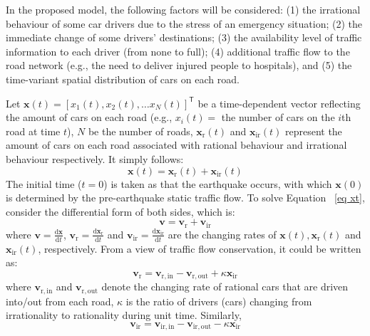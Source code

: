 \documentclass[review,11pt,nonatbib]{elsarticle}
\begin{document}
\par In the proposed model, the following factors will be considered: (1) the irrational behaviour of some car drivers due to the stress of an emergency situation; (2) the immediate change of some drivers' destinations; (3) the availability level of traffic information to each driver (from none to full); (4) additional traffic flow to the road network (e.g., the need to deliver injured people to hospitals), and (5) the time-variant spatial distribution of cars on each road.
\par Let $\mathbf{x}(t) = [x_1(t),x_2(t),\ldots x_N(t)]^{\textsf{T}}$ be a time-dependent vector reflecting the amount of cars on each road (e.g., $x_i(t) = $ the number of cars on the $i$th road at time $t$),  $N$ be the number of roads, $\mathbf{x}_{\mathrm{r}}(t)$ and $\mathbf{x}_{\mathrm{ir}}(t)$ represent the amount of cars on each road associated with rational behaviour and irrational behaviour respectively. It simply follows:
\begin{equation}\label{eq xt}
\mathbf{x}(t)=\mathbf{x}_{\mathrm{r}}(t)+\mathbf{x}_{\mathrm{ir}}(t)
\end{equation}
The initial time ($t=0$) is taken as that the earthquake occurs, with which $\mathbf{x}(0)$ is determined by the pre-earthquake static traffic flow. To solve Equation ~\eqref{eq xt}, consider the differential form of both sides, which is:
\begin{equation}
\mathbf{v} = \mathbf{v}_{\mathrm{r}} + \mathbf{v}_{\mathrm{ir}}
\end{equation}
where $\mathbf{v} = \frac{\mathrm{d}\mathbf{x}}{\mathrm{d}t}$, $\mathbf{v}_{\mathrm{r}} = \frac{\mathrm{d}\mathbf{x}_{\mathrm{r}}}{\mathrm{d}t}$ and $ \mathbf{v}_{\mathrm{ir}} = \frac{\mathrm{d}\mathbf{x}_{\mathrm{ir}}}{\mathrm{d}t}$ are the changing rates of $\mathbf{x}(t), \mathbf{x}_{\mathrm{r}}(t)$ and $\mathbf{x}_{\mathrm{ir}}(t)$, respectively. From a view of traffic flow conservation, it could be written as:
\begin{equation}\label{eq vr}
\mathbf{v}_{\mathrm{r}}  = \mathbf{v}_{\mathrm{r,in}} - \mathbf{v}_{\mathrm{r,out}} + \kappa \mathbf{x}_{\mathrm{ir}}
\end{equation}
where $\mathbf{v}_{\mathrm{r,in}} $ and $\mathbf{v}_{\mathrm{r,out}}$ denote the changing rate of rational cars that are driven into/out from each road, $\kappa$ is the ratio of drivers (cars) changing from irrationality to rationality during unit time. Similarly,
\begin{equation}\label{eq vir}
\mathbf{v}_{\mathrm{ir}}  = \mathbf{v}_{\mathrm{ir,in}} - \mathbf{v}_{\mathrm{ir,out}} - \kappa \mathbf{x}_{\mathrm{ir}}
\end{equation}
\end{document}
